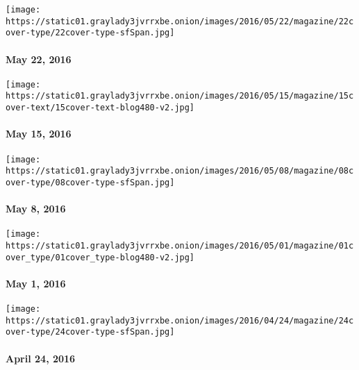 \href{http://www.nytimes3xbfgragh.onion/indexes/2016/05/22/magazine/index.html}{}

\texttt{[image: https://static01.graylady3jvrrxbe.onion/images/2016/05/22/magazine/22cover-type/22cover-type-sfSpan.jpg]}

\hypertarget{may-22-2016}{%
\paragraph{May 22, 2016}\label{may-22-2016}}

\href{http://www.nytimes3xbfgragh.onion/indexes/2016/05/15/magazine/index.html}{}

\texttt{[image: https://static01.graylady3jvrrxbe.onion/images/2016/05/15/magazine/15cover-text/15cover-text-blog480-v2.jpg]}

\hypertarget{may-15-2016}{%
\paragraph{May 15, 2016}\label{may-15-2016}}

\href{http://www.nytimes3xbfgragh.onion/indexes/2016/05/05/magazine/index.html}{}

\texttt{[image: https://static01.graylady3jvrrxbe.onion/images/2016/05/08/magazine/08cover-type/08cover-type-sfSpan.jpg]}

\hypertarget{may-8-2016}{%
\paragraph{May 8, 2016}\label{may-8-2016}}

\href{http://www.nytimes3xbfgragh.onion/indexes/2016/05/01/magazine/index.html}{}

\texttt{[image: https://static01.graylady3jvrrxbe.onion/images/2016/05/01/magazine/01cover\_type/01cover\_type-blog480-v2.jpg]}

\hypertarget{may-1-2016}{%
\paragraph{May 1, 2016}\label{may-1-2016}}

\href{http://www.nytimes3xbfgragh.onion/indexes/2016/04/24/magazine/index.html}{}

\texttt{[image: https://static01.graylady3jvrrxbe.onion/images/2016/04/24/magazine/24cover-type/24cover-type-sfSpan.jpg]}

\hypertarget{april-24-2016}{%
\paragraph{April 24, 2016}\label{april-24-2016}}

